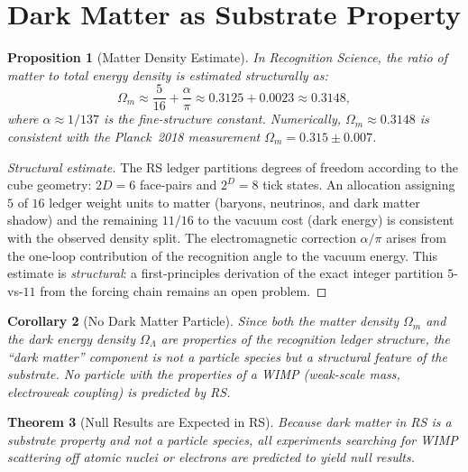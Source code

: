 \documentclass[12pt,a4paper]{article}
\newtheorem{theorem}{Theorem}[section]
\newtheorem{corollary}[theorem]{Corollary}
\newtheorem{proposition}[theorem]{Proposition}
\theoremstyle{definition}
\theoremstyle{remark}
\begin{document}
\section{Dark Matter as Substrate Property}
\label{sec:substrate}

\begin{proposition}[Matter Density Estimate]
\label{thm:omega}
In Recognition Science, the ratio of matter to total energy density
is estimated structurally as:
\begin{equation}
  \Omega_m \approx \frac{5}{16} + \frac{\alpha}{\pi}
  \approx 0.3125 + 0.0023 \approx 0.3148,
\end{equation}
where $\alpha \approx 1/137$ is the fine-structure constant.
Numerically, $\Omega_m \approx 0.3148$ is consistent with the
Planck~2018 measurement $\Omega_m = 0.315 \pm 0.007$.
\end{proposition}

\begin{proof}[Structural estimate]
The RS ledger partitions degrees of freedom according to the cube
geometry: $2D = 6$ face-pairs and $2^D = 8$ tick states.  An
allocation assigning $5$ of $16$ ledger weight units to matter
(baryons, neutrinos, and dark matter shadow) and the remaining
$11/16$ to the vacuum cost (dark energy) is consistent with the
observed density split.  The electromagnetic correction
$\alpha/\pi$ arises from the one-loop contribution of the
recognition angle to the vacuum energy.  This estimate is
\emph{structural}: a first-principles derivation of the exact
integer partition $5$-vs-$11$ from the forcing chain remains an
open problem.
\end{proof}

\begin{corollary}[No Dark Matter Particle]
\label{cor:no-wimp}
Since both the matter density $\Omega_m$ and the dark energy density
$\Omega_\Lambda$ are properties of the recognition ledger structure,
the ``dark matter'' component is not a particle species but a
structural feature of the substrate.  No particle with the properties
of a WIMP (weak-scale mass, electroweak coupling) is predicted by RS.
\end{corollary}

\begin{theorem}[Null Results are Expected in RS]
\label{thm:null}
Because dark matter in RS is a substrate property and not a particle
species, all experiments searching for WIMP scattering off atomic
nuclei or electrons are predicted to yield null results.
\end{theorem}
\end{document}
